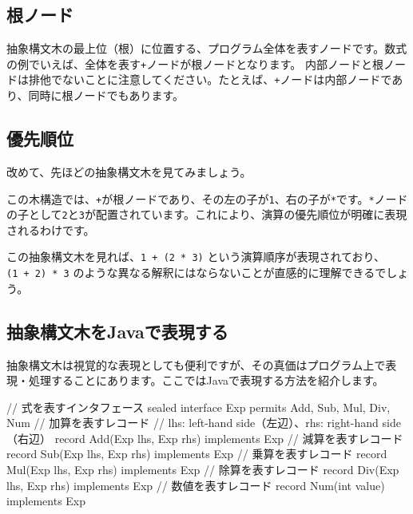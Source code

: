 \subsection{根ノード}

抽象構文木の最上位（根）に位置する、プログラム全体を表すノードです。数式の例でいえば、全体を表す\texttt{+}ノードが根ノードとなります。
内部ノードと根ノードは排他でないことに注意してください。たとえば、\texttt{+}ノードは内部ノードであり、同時に根ノードでもあります。

\subsection{優先順位}

改めて、先ほどの抽象構文木を見てみましょう。

\begin{center}
\end{center}

この木構造では、\texttt{+}が根ノードであり、その左の子が\texttt{1}、右の子が\texttt{*}です。\texttt{*}ノードの子として\texttt{2}と\texttt{3}が配置されています。これにより、演算の優先順位が明確に表現されるわけです。

この抽象構文木を見れば、\texttt{1\ +\ (2\ *\ 3)}
という演算順序が表現されており、\texttt{(1\ +\ 2)\ *\ 3}
のような異なる解釈にはならないことが直感的に理解できるでしょう。

\subsection{抽象構文木をJavaで表現する}

抽象構文木は視覚的な表現としても便利ですが、その真価はプログラム上で表現・処理することにあります。ここではJavaで表現する方法を紹介します。

\begin{codescreen}{}
// 式を表すインタフェース
sealed interface Exp permits Add, Sub, Mul, Div, Num {}
// 加算を表すレコード
// lhs: left-hand side（左辺）、rhs: right-hand side（右辺）
record Add(Exp lhs, Exp rhs) implements Exp {}
// 減算を表すレコード
record Sub(Exp lhs, Exp rhs) implements Exp {}
// 乗算を表すレコード
record Mul(Exp lhs, Exp rhs) implements Exp {}
// 除算を表すレコード
record Div(Exp lhs, Exp rhs) implements Exp {}
// 数値を表すレコード
record Num(int value) implements Exp {}
\end{codescreen}

